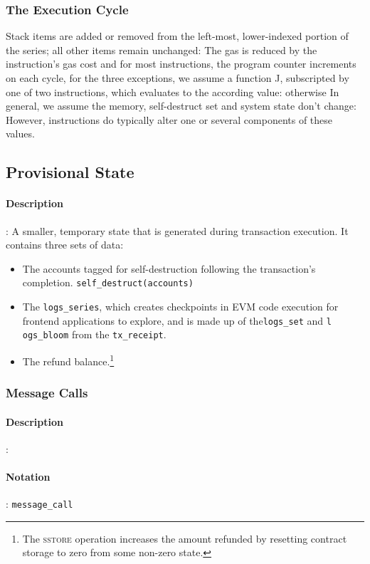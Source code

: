 \documentclass[10pt,a4paper,leqno,bibliography=totoc]{scrartcl}
\newenvironment{alphafootnotes}
{\par\edef\savedfootnotenumber{\number\value{footnote}}
\renewcommand{\thefootnote}{\alph{footnote}}
\setcounter{footnote}{0}}
{\par\setcounter{footnote}{\savedfootnotenumber}}
\begin{document}
\begin{alphafootnotes}
\begin{multicols*}{2}
				\subsubsection{The Execution Cycle} Stack items are added or removed from the left-most, lower-indexed portion of the series; all other items remain unchanged:  The gas is reduced by the instruction’s gas cost and for most instructions, the program counter increments on each cycle, for the three exceptions, we assume a function J, subscripted by one of two instructions, which evaluates to the according value: otherwise In general, we assume the memory, self-destruct set and system state don’t change: However, instructions do typically alter one or several components of these values. 
				
				\subsection{Provisional State}
					\paragraph{Description}: A smaller, temporary state that is generated during transaction execution. It contains three sets of data:

\begin{itemize}
        \item The accounts tagged for self-destruction following the transaction's completion. \texttt{self\_destruct(accounts)}
        \item The \texttt{logs\_series}, which creates checkpoints in EVM code execution for frontend applications to explore, and is made up of the\texttt{logs\_set} and \texttt{l
ogs\_bloom} from the \texttt{tx\_receipt}.
	\item The refund balance.\footnote{The \textsc{sstore} operation increases the amount refunded by resetting contract storage to zero from some non-zero state.}
\end{itemize}

			\subsubsection{Message Calls}
\paragraph{Description}:\paragraph{Notation}: \texttt{message\_call}

\end{multicols*}
\end{alphafootnotes}
\end{document}
